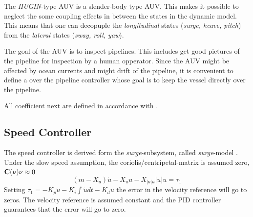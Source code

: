 	The \textit{HUGIN}-type AUV is a slender-body type AUV. This makes it possible to neglect the some
	coupling effects in between the states in the dynamic model. This means that one can decopuple the
	\textit{longitudinal} states (\textit{surge, heave, pitch}) from the \textit{lateral} states 
	(\textit{sway, roll, yaw}).

	The goal of the AUV is to inspect pipelines. This includes get good pictures of the pipeline for
	inspection by a human opperator. Since the AUV might be affected by ocean currents and might drift of
	the pipeline, it is convenient to define a over the pipeline controller whose goal is to keep the
	vessel directly over the pipeline. 

	All coefficient next are defined in accordance with \cite{SNAME}.
	\subsection{Speed Controller}
		The speed controller is derived form the \textit{surge}-subsystem, called \textit{surge}-model
		\cite{fossen}. Under the slow speed assumption, the coriolis/centripetal-matrix is assumed
		zero, $\mathbf{C}(\mathbf{\nu})\mathbf{\nu} \approx 0$  
		\begin{equation}
			(m - X_{\dot{u}})\dot{u} - X_u u - X_{|u|u}|u| u = \tau_1
		\end{equation}
		Setting $\tau_1 = -K_p \tilde{u} - K_i \int \tilde{u} dt - K_d \dot{u}$ the error in the velocity
		reference will go to zeros. The velocity reference is assumed constant and the PID controller
		guarantees that the error will go to zero.
	
	
	
